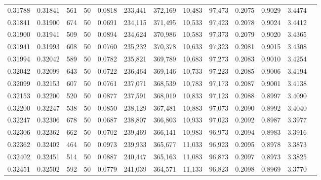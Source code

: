 \begin{tabular}{rrrrrrrrrrrrr}
0.31788 & 0.31841 &   561 &  50 &                                     0.0818 & 233,441 & 372,169 &  10,483 &  97,473 & 0.2075 & 0.9029 & 3.4474 \\
0.31841 & 0.31900 &   674 &  50 &                                     0.0691 & 234,115 & 371,495 &  10,533 &  97,423 & 0.2078 & 0.9024 & 3.4412 \\
0.31900 & 0.31941 &   509 &  50 &                                     0.0894 & 234,624 & 370,986 &  10,583 &  97,373 & 0.2079 & 0.9020 & 3.4365 \\
0.31941 & 0.31993 &   608 &  50 &                                     0.0760 & 235,232 & 370,378 &  10,633 &  97,323 & 0.2081 & 0.9015 & 3.4308 \\
0.31994 & 0.32042 &   589 &  50 &                                     0.0782 & 235,821 & 369,789 &  10,683 &  97,273 & 0.2083 & 0.9010 & 3.4254 \\
0.32042 & 0.32099 &   643 &  50 &                                     0.0722 & 236,464 & 369,146 &  10,733 &  97,223 & 0.2085 & 0.9006 & 3.4194 \\
0.32099 & 0.32153 &   607 &  50 &                                     0.0761 & 237,071 & 368,539 &  10,783 &  97,173 & 0.2087 & 0.9001 & 3.4138 \\
0.32153 & 0.32200 &   520 &  50 &                                     0.0877 & 237,591 & 368,019 &  10,833 &  97,123 & 0.2088 & 0.8997 & 3.4090 \\
0.32200 & 0.32247 &   538 &  50 &                                     0.0850 & 238,129 & 367,481 &  10,883 &  97,073 & 0.2090 & 0.8992 & 3.4040 \\
0.32247 & 0.32306 &   678 &  50 &                                     0.0687 & 238,807 & 366,803 &  10,933 &  97,023 & 0.2092 & 0.8987 & 3.3977 \\
0.32306 & 0.32362 &   662 &  50 &                                     0.0702 & 239,469 & 366,141 &  10,983 &  96,973 & 0.2094 & 0.8983 & 3.3916 \\
0.32362 & 0.32402 &   464 &  50 &                                     0.0973 & 239,933 & 365,677 &  11,033 &  96,923 & 0.2095 & 0.8978 & 3.3873 \\
0.32402 & 0.32451 &   514 &  50 &                                     0.0887 & 240,447 & 365,163 &  11,083 &  96,873 & 0.2097 & 0.8973 & 3.3825 \\
0.32451 & 0.32502 &   592 &  50 &                                     0.0779 & 241,039 & 364,571 &  11,133 &  96,823 & 0.2098 & 0.8969 & 3.3770 \\

\end{tabular}
